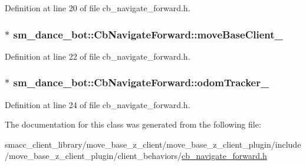 Definition at line 20 of file cb\+\_\+navigate\+\_\+forward.\+h.

\subsubsection[{\texorpdfstring{move\+Base\+Client\+\_\+}{moveBaseClient_}}]{ $\ast$ sm\+\_\+dance\+\_\+bot\+::\+Cb\+Navigate\+Forward\+::move\+Base\+Client\+\_\+}\hypertarget{classsm__dance__bot_1_1CbNavigateForward_aa8925dbb246e8decc95e226818fa63ea}{}\label{classsm__dance__bot_1_1CbNavigateForward_aa8925dbb246e8decc95e226818fa63ea}


Definition at line 22 of file cb\+\_\+navigate\+\_\+forward.\+h.

\subsubsection[{\texorpdfstring{odom\+Tracker\+\_\+}{odomTracker_}}]{ $\ast$ sm\+\_\+dance\+\_\+bot\+::\+Cb\+Navigate\+Forward\+::odom\+Tracker\+\_\+}\hypertarget{classsm__dance__bot_1_1CbNavigateForward_ab85e95221e19ed988e0113f5f6ad96c2}{}\label{classsm__dance__bot_1_1CbNavigateForward_ab85e95221e19ed988e0113f5f6ad96c2}


Definition at line 24 of file cb\+\_\+navigate\+\_\+forward.\+h.



The documentation for this class was generated from the following file\+:\begin{DoxyCompactItemize}
\item 
smacc\+\_\+client\+\_\+library/move\+\_\+base\+\_\+z\+\_\+client/move\+\_\+base\+\_\+z\+\_\+client\+\_\+plugin/include/move\+\_\+base\+\_\+z\+\_\+client\+\_\+plugin/client\+\_\+behaviors/\hyperlink{smacc__client__library_2move__base__z__client_2move__base__z__client__plugin_2include_2move__bas3f31d4d52bbf09e30133b849422d4b0f}{cb\+\_\+navigate\+\_\+forward.\+h}\end{DoxyCompactItemize}
